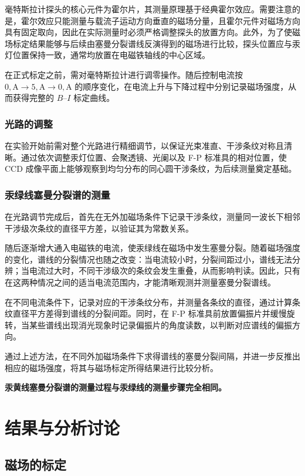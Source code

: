 \documentclass[a4paper, 1.5lines]{ctexart}
\begin{document}
毫特斯拉计探头的核心元件为霍尔片，其测量原理基于经典霍尔效应。需要注意的是，霍尔效应只能测量与载流子运动方向垂直的磁场分量，且霍尔元件对磁场方向具有固定取向，因此在实际测量时必须严格调整探头的放置方向。此外，为了使磁场标定结果能够与后续由塞曼分裂谱线反演得到的磁场进行比较，探头位置应与汞灯位置保持一致，通常均放置在电磁铁轴线的中心区域。

在正式标定之前，需对毫特斯拉计进行调零操作。随后控制电流按 $0,\mathrm{A} \rightarrow 5,\mathrm{A} \rightarrow 0,\mathrm{A}$ 的顺序变化，在电流上升与下降过程中分别记录磁场强度，从而获得完整的 $B$–$I$ 标定曲线。

\subsubsection{光路的调整}

在实验开始前需对整个光路进行精细调节，以保证光束准直、干涉条纹对称且清晰。通过依次调整汞灯位置、会聚透镜、光阑以及 F-P 标准具的相对位置，使 CCD 成像平面上能够观察到均匀分布的同心圆干涉条纹，为后续测量奠定基础。

\subsubsection{汞绿线塞曼分裂谱的测量}

在光路调节完成后，首先在无外加磁场条件下记录干涉条纹，测量同一波长下相邻干涉级次条纹的直径平方差，以验证其为常数关系。

随后逐渐增大通入电磁铁的电流，使汞绿线在磁场中发生塞曼分裂。随着磁场强度的变化，谱线的分裂情况也随之改变：当电流较小时，分裂间距过小，谱线无法分辨；当电流过大时，不同干涉级次的条纹会发生重叠，从而影响判读。因此，只有在这两种情况之间的适当电流范围内，才能清晰观测并测量塞曼分裂谱线。

在不同电流条件下，记录对应的干涉条纹分布，并测量各条纹的直径，通过计算条纹直径平方差得到谱线的分裂间距。同时，在 F-P 标准具前放置偏振片并缓慢旋转，当某些谱线出现消光现象时记录偏振片的角度读数，以判断对应谱线的偏振方向。

通过上述方法，在不同外加磁场条件下求得谱线的塞曼分裂间隔，并进一步反推出相应的磁场强度，将其与磁场标定所得结果进行比较分析。

\textbf{汞黄线塞曼分裂谱的测量过程与汞绿线的测量步骤完全相同。}

        
    \section{结果与分析讨论}
        \subsection{磁场的标定}
\end{document}
